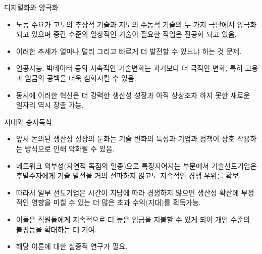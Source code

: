 \documentclass[aspectratio=169,xcolor=dvipsnames,handout]{beamer}
\begin{document}
\begin{frame}{디지털화와 양극화}
    \begin{itemize}
         \item 노동 수요가 고도의 추상적 기술과 저도의 수동적 기술의 두 가지 극단에서 양극화되고 있으며 중간 수준의 일상적인 기술이 필요한 직업은 진공화 되고 있음.
         \item 이러한 추세가 얼마나 멀리 그리고 빠르게 더 발전할 수 있느냐 하는 것 문제.
         \item 인공지능, 빅데이터 등의 지속적인 기술변화는 과거보다 더 극적인 변화, 특히 고용과 임금의 공백을 더욱 심화시킬 수 있음.
         \item 동시에 이러한 혁신은 더 강력한 생산성 성장과 아직 상상조차 하지 못한 새로운 일자리 역시 창출 가능.
    \end{itemize}
\end{frame}

\begin{frame}{지대와 승자독식}
    \begin{itemize}
        \item  앞서 논의된 생산성 성장의 둔화는 기술 변화의 특성과 기업과 정책이 상호 작용하는 방식으로 인해 악화될 수 있음.
         \item 네트워크 외부성(자연적 독점의 일종)으로 특징지어지는 부문에서 기술선도기업은 후발주자에게 기술 발전을 거의 전파하지 않고도 지속적인 경쟁 우위를 확보.
         \item 따라서 일부 선도기업은 시간이 지남에 따라 경쟁하지 않으면 생산성 확산에 부정적인 영향을 미칠 수 있는 더 많은 초과 수익(지대)를 획득가능.
         \item 이들은 직원들에게 지속적으로 더 높은 임금을 지불할 수 있게 되어 개인 수준의 불평등을 확대하는 데 기여.
         \item 해당 이론에 대한 실증적 연구가 필요.
    \end{itemize}
\end{frame}
\end{document}
